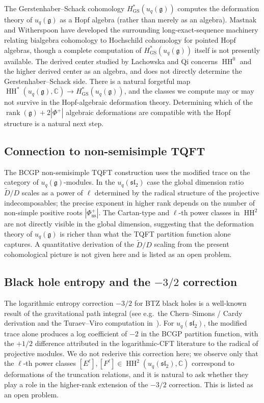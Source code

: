 \documentclass[11pt,letterpaper]{amsart}
\theoremstyle{plain}
\theoremstyle{definition}
\theoremstyle{remark}
\newcommand{\HH}{\operatorname{HH}}
\newcommand{\CC}{\mathbb{C}}
\begin{document}
The Gerstenhaber--Schack cohomology $H_{\mathrm{GS}}^*(u_q(\mathfrak{g}))$ computes the deformation theory of $u_q(\mathfrak{g})$ as a Hopf algebra (rather than merely as an algebra). Mastnak and Witherspoon\cite{MW08} have developed the surrounding long-exact-sequence machinery relating bialgebra cohomology to Hochschild cohomology for pointed Hopf algebras, though a complete computation of $H_{\mathrm{GS}}^*(u_q(\mathfrak{g}))$ itself is not presently available. The derived center studied by Lachowska and Qi\cite{LQ21} concerns $\HH^0$ and the higher derived center as an algebra, and does not directly determine the Gerstenhaber--Schack side. There is a natural forgetful map $\HH^*(u_q(\mathfrak{g}), \CC) \to H_{\mathrm{GS}}^*(u_q(\mathfrak{g}))$, and the classes we compute may or may not survive in the Hopf-algebraic deformation theory. Determining which of the $\operatorname{rank}(\mathfrak{g}) + 2|\Phi^+|$ algebraic deformations are compatible with the Hopf structure is a natural next step.

\subsection{Connection to non-semisimple TQFT}

The BCGP non-semisimple TQFT construction\cite{BCGP} uses the modified trace on the category of $u_q(\mathfrak{g})$-modules. In the $u_q(\mathfrak{sl}_2)$ case the global dimension ratio $\tilde{D}/D$ scales as a power of $\ell$ determined by the radical structure of the projective indecomposables; the precise exponent in higher rank depends on the number of non-simple positive roots $|\Phi^+_{\mathrm{ns}}|$. The Cartan-type and $\ell$-th power classes in $\HH^2$ are not directly visible in the global dimension, suggesting that the deformation theory of $u_q(\mathfrak{g})$ is richer than what the TQFT partition function alone captures. A quantitative derivation of the $\tilde{D}/D$ scaling from the present cohomological picture is not given here and is listed as an open problem.

\subsection{Black hole entropy and the $-3/2$ correction}

The logarithmic entropy correction $-3/2$ for BTZ black holes is a well-known result of the gravitational path integral (see e.g.\ the Chern--Simons / Cardy derivation and the Turaev--Viro computation in~\cite{BCGP}). For $u_q(\mathfrak{sl}_2)$, the modified trace alone produces a log coefficient of $-2$ in the BCGP partition function, with the $+1/2$ difference attributed in the logarithmic-CFT literature to the radical of projective modules. We do not rederive this correction here; we observe only that the $\ell$-th power classes $[E^\ell], [F^\ell] \in \HH^2(u_q(\mathfrak{sl}_2), \CC)$ correspond to deformations of the truncation relations, and it is natural to ask whether they play a role in the higher-rank extension of the $-3/2$ correction. This is listed as an open problem.
\end{document}
